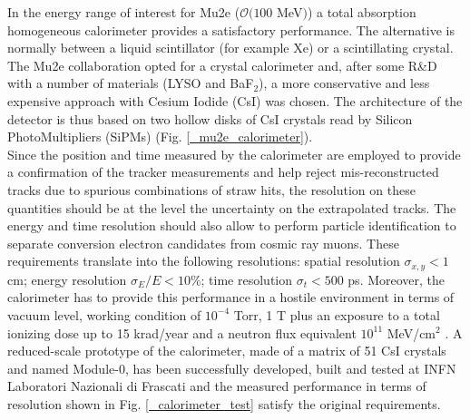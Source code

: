\documentclass[12pt,a4paper,openright, oneside, titlepage]{book} %
\begin{document}
\noindent
In the energy range of interest for Mu2e ($ \mathcal{O}(100$ MeV$)$) 
a total absorption homogeneous calorimeter 
provides a satisfactory performance. 
The alternative is normally between a liquid scintillator (for example Xe) or a scintillating crystal. 
The Mu2e collaboration opted for a crystal calorimeter and, 
after some R\&D with a number of materials (LYSO and BaF$_2$),
a more conservative and less expensive approach with Cesium Iodide (CsI) was chosen. 
The architecture of the detector is thus based on two hollow disks of CsI crystals read by 
Silicon PhotoMultipliers (SiPMs) (Fig. \ref{_mu2e_calorimeter}).\\ 
Since the position and time measured by the calorimeter are employed to provide a confirmation of the tracker measurements and help reject mis-reconstructed tracks due to spurious combinations of straw hits, the resolution on these quantities should be at the level the uncertainty on the extrapolated tracks. 
The energy and time resolution should also allow to perform particle identification to separate conversion electron candidates from cosmic ray muons. 
These requirements translate into the following resolutions: 
spatial resolution $\sigma_{x,y}<1$ cm; 
energy resolution $\sigma_E/E <10\%$; 
time resolution $\sigma_t < 500$ ps.
Moreover, the calorimeter has to provide this performance in a hostile environment
in terms of vacuum level, working condition of $10^{-4}$ Torr, 1 T plus an exposure to a total ionizing dose up to 15 krad/year and a neutron flux equivalent $10^{11}$ MeV/cm$^2$ \cite{Donghia:2019}.
A reduced-scale prototype of the calorimeter, made of a matrix of 51 CsI crystals and named Module-0, has been successfully developed, built and tested at INFN Laboratori Nazionali di Frascati and the measured performance in terms of resolution shown in Fig. \ref{_calorimeter_test} satisfy the original requirements.
\end{document}
